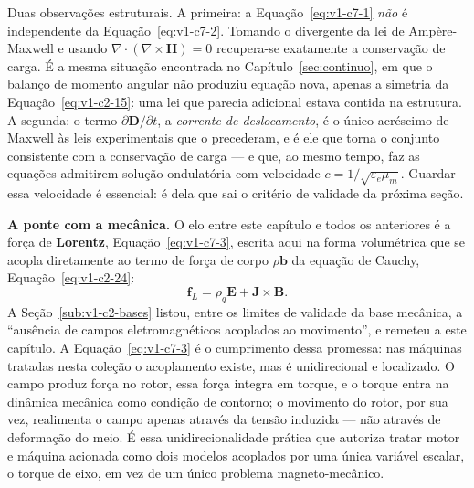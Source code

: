 \documentclass[12pt,a4paper]{article}
\numberwithin{equation}{section}
\numberwithin{table}{section}
\numberwithin{figure}{section}
\begin{document}
Duas observações estruturais. A primeira: a Equação~\eqref{eq:v1-c7-1}
\emph{não} é independente da Equação~\eqref{eq:v1-c7-2}. Tomando o divergente
da lei de Ampère-Maxwell e usando $\nabla\cdot(\nabla\times\mathbf{H})=0$
recupera-se exatamente a conservação de carga. É a mesma situação encontrada no
Capítulo~\ref{sec:continuo}, em que o balanço de momento angular não produziu
equação nova, apenas a simetria da Equação~\eqref{eq:v1-c2-15}: uma lei que
parecia adicional estava contida na estrutura. A segunda: o termo
$\partial\mathbf{D}/\partial t$, a \emph{corrente de deslocamento}, é o único
acréscimo de Maxwell às leis experimentais que o precederam, e é ele que torna
o conjunto consistente com a conservação de carga --- e que, ao mesmo tempo,
faz as equações admitirem solução ondulatória com velocidade
$c = 1/\sqrt{\varepsilon_e\mu_m}$. Guardar essa velocidade é essencial: é dela
que sai o critério de validade da próxima seção.

\textbf{A ponte com a mecânica.} O elo entre este capítulo e todos os
anteriores é a força de \textbf{Lorentz}, Equação~\eqref{eq:v1-c7-3}, escrita
aqui na forma volumétrica que se acopla diretamente ao termo de força de corpo
$\rho\mathbf{b}$ da equação de Cauchy, Equação~\eqref{eq:v1-c2-24}:
\begin{equation}\label{eq:v1-c7-3}
\mathbf{f}_{L} = \rho_q\mathbf{E} + \mathbf{J}\times\mathbf{B} .
\end{equation}
A Seção~\ref{sub:v1-c2-bases} listou, entre os limites de validade da base
mecânica, a ``ausência de campos eletromagnéticos acoplados ao movimento'', e
remeteu a este capítulo. A Equação~\eqref{eq:v1-c7-3} é o cumprimento dessa
promessa: nas máquinas tratadas nesta coleção o acoplamento existe, mas é
unidirecional e localizado. O campo produz força no rotor, essa força integra
em torque, e o torque entra na dinâmica mecânica como condição de contorno; o
movimento do rotor, por sua vez, realimenta o campo apenas através da tensão
induzida --- não através de deformação do meio. É essa unidirecionalidade
prática que autoriza tratar motor e máquina acionada como dois modelos
acoplados por uma única variável escalar, o torque de eixo, em vez de um único
problema magneto-mecânico.
\end{document}
